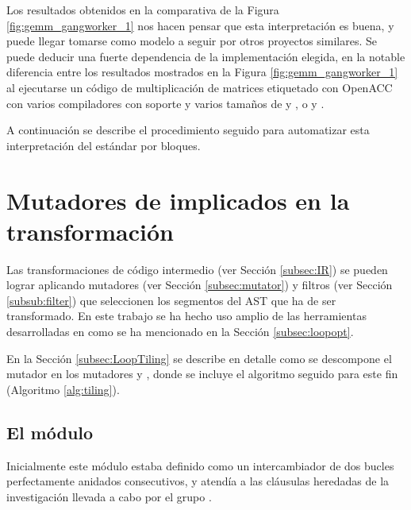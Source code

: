 Los resultados obtenidos en la comparativa de la Figura \ref{fig:gemm_gangworker_1} 
nos hacen pensar que esta interpretación es buena, y puede llegar tomarse como modelo a 
seguir por otros proyectos similares. Se puede deducir una fuerte dependencia de la 
implementación elegida, en la notable 
diferencia entre los resultados mostrados en la Figura \ref{fig:gemm_gangworker_1} al 
ejecutarse un código de multiplicación de matrices etiquetado con \ac{OpenACC} con 
varios compiladores con soporte \OpenACC{} y varios tamaños de \gang{} y \worker{}, o 
\gang{} y \cvector{}.

A continuación se describe el procedimiento seguido para automatizar esta interpretación 
del estándar por bloques.

\section{Mutadores de \yacf{} implicados en la transformación}
\label{sec:mutatorstiling}

Las transformaciones de código intermedio (ver Sección \ref{subsec:IR}) se pueden 
lograr aplicando mutadores (ver Sección \ref{subsec:mutator}) y filtros (ver Sección 
\ref{subsub:filter}) que seleccionen los segmentos del \ac{AST} que ha de ser 
transformado. En este trabajo se ha hecho uso amplio de las herramientas desarrolladas
en \yacf{} como se ha mencionado en la Sección \ref{subsec:loopopt}.


En la Sección \ref{subsec:LoopTiling} se describe en detalle como se descompone el mutador 
 en los mutadores  y 
, donde se incluye el algoritmo seguido
para este fin (Algoritmo \ref{alg:tiling}).


\subsection{El módulo }
Inicialmente este módulo estaba definido como un
intercambiador de dos bucles perfectamente anidados consecutivos, y atendía a las 
cláusulas \llc{} \cite{URL::LLC} heredadas de la investigación llevada a cabo por el grupo
\cite{Garcia:1997:LLC,Luna:1998:HED} \cite{Almeida:2003:PSU,Dorta:2003:LPS}
\cite{Reyes:2011:ACG}. 

